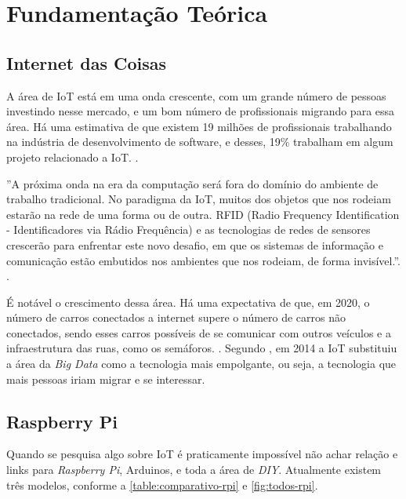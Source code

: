 \chapter{Fundamentação Teórica}\label{cap:fundamentacao-teorica}

\section{Internet das Coisas}\label{sec:internet-das-coisas}

A área de IoT está em uma onda crescente, com um grande número de pessoas investindo nesse mercado, e um bom número de profissionais migrando para essa área. Há uma estimativa de que existem 19 milhões de profissionais trabalhando na indústria de desenvolvimento de software, e desses, 19\% trabalham em algum projeto relacionado a IoT. \cite{cw-iot}.

\begin{citacao}
''A próxima onda na era da computação será fora do domínio do ambiente de trabalho tradicional. No paradigma da IoT, muitos dos objetos que nos rodeiam estarão na rede de uma forma ou de outra. RFID (Radio Frequency Identification - Identificadores via Rádio Frequência) e as tecnologias de redes de sensores crescerão para enfrentar este novo desafio, em que os sistemas de informação e comunicação estão embutidos nos ambientes que nos rodeiam, de forma invisível.''. \cite{iot-article}. 
\end{citacao}

É notável o crescimento dessa área. Há uma expectativa de que, em 2020, o número de carros conectados a internet supere o número de carros não conectados, sendo esses carros possíveis de se comunicar com outros veículos e a infraestrutura das ruas, como os semáforos. \cite{goldmansachs-iot}. Segundo , em 2014 a IoT substituiu a área da \textit{Big Data} como a tecnologia mais empolgante, ou seja, a tecnologia que mais pessoas iriam migrar e se interessar. 


\section{Raspberry Pi}\label{sec:raspberry-pi}

Quando se pesquisa algo sobre IoT é praticamente impossível não achar relação e links para \textit{Raspberry Pi}, Arduinos, e toda a área de \textit{DIY}. Atualmente existem três modelos, conforme a \autoref{table:comparativo-rpi} e \autoref{fig:todos-rpi}. 

